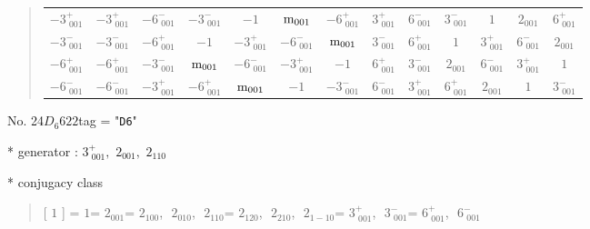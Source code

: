 \documentclass[fleqn,10pt,landscape]{jsarticle}
\begin{document}
\begin{quote}
\begin{tabular}{ccccccccccccc}
$ -3^{+}_{\,\,001} $ & $ -3^{+}_{\,\,001} $ & $ -6^{-}_{\,\,001} $ & $ -3^{-}_{\,\,001} $ & $ -1 $ & $ {\rm m}_{001} $ & $ -6^{+}_{\,\,001} $ & $ 3^{+}_{\,\,001} $ & $ 6^{-}_{\,\,001} $ & $ 3^{-}_{\,\,001} $ & $ 1 $ & $ 2{}_{001} $ & $ 6^{+}_{\,\,001} $ \\
$ -3^{-}_{\,\,001} $ & $ -3^{-}_{\,\,001} $ & $ -6^{+}_{\,\,001} $ & $ -1 $ & $ -3^{+}_{\,\,001} $ & $ -6^{-}_{\,\,001} $ & $ {\rm m}_{001} $ & $ 3^{-}_{\,\,001} $ & $ 6^{+}_{\,\,001} $ & $ 1 $ & $ 3^{+}_{\,\,001} $ & $ 6^{-}_{\,\,001} $ & $ 2{}_{001} $ \\
$ -6^{+}_{\,\,001} $ & $ -6^{+}_{\,\,001} $ & $ -3^{-}_{\,\,001} $ & $ {\rm m}_{001} $ & $ -6^{-}_{\,\,001} $ & $ -3^{+}_{\,\,001} $ & $ -1 $ & $ 6^{+}_{\,\,001} $ & $ 3^{-}_{\,\,001} $ & $ 2{}_{001} $ & $ 6^{-}_{\,\,001} $ & $ 3^{+}_{\,\,001} $ & $ 1 $ \\
$ -6^{-}_{\,\,001} $ & $ -6^{-}_{\,\,001} $ & $ -3^{+}_{\,\,001} $ & $ -6^{+}_{\,\,001} $ & $ {\rm m}_{001} $ & $ -1 $ & $ -3^{-}_{\,\,001} $ & $ 6^{-}_{\,\,001} $ & $ 3^{+}_{\,\,001} $ & $ 6^{+}_{\,\,001} $ & $ 2{}_{001} $ & $ 1 $ & $ 3^{-}_{\,\,001} $ \\
 \hline \hline
\end{tabular}
\end{quote}

\newpage

No. 24\quad$D_{6}$\quad$622$\quad[ hexagonal ]
tag = "{\tt D6}"

* generator : $3^{+}_{\,\,001},\,\,2{}_{001},\,\,2{}_{110}$

* conjugacy class
\begin{quote}
[ $1$ ] = \quad $1$\newline[ $2{}_{001}$ ] = \quad $2{}_{001}$\newline[ $2{}_{100}$ ] = \quad $2{}_{100}$,\,\, $2{}_{010}$,\,\, $2{}_{110}$\newline[ $2{}_{120}$ ] = \quad $2{}_{120}$,\,\, $2{}_{210}$,\,\, $2{}_{1-10}$\newline[ $3^{+}_{\,\,001}$ ] = \quad $3^{+}_{\,\,001}$,\,\, $3^{-}_{\,\,001}$\newline[ $6^{+}_{\,\,001}$ ] = \quad $6^{+}_{\,\,001}$,\,\, $6^{-}_{\,\,001}$\newline
\end{quote}
\end{document}
